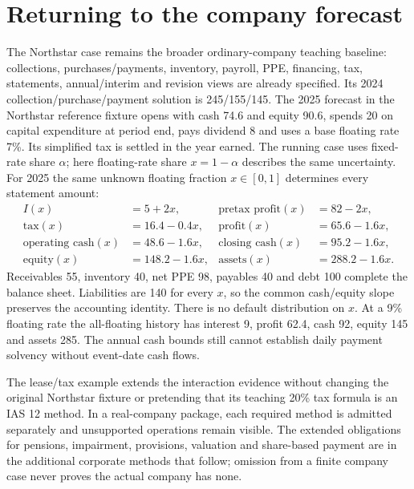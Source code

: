 

\hypertarget{returning-to-the-company-forecast}{%
\section{Returning to the company forecast}\label{method-corporate-methods-returning-to-the-company-forecast}}

The Northstar case remains the broader ordinary-company teaching baseline: collections, purchases/payments, inventory, payroll, PPE, financing, tax, statements, annual/interim and revision views are already specified. Its 2024 collection/purchase/payment solution is 245/155/145. The 2025 forecast in the Northstar reference fixture opens with cash 74.6 and equity 90.6, spends 20 on capital expenditure at period end, pays dividend 8 and uses a base floating rate 7\%. Its simplified tax is settled in the year earned. The running case uses fixed-rate share $\alpha$; here floating-rate share $x=1-\alpha$ describes the same uncertainty. For 2025 the same unknown floating fraction $x\in[0,1]$ determines every
statement amount:
\begin{align*}
 I(x)&=5+2x, & \text{pretax profit}(x)&=82-2x,\\
 \text{tax}(x)&=16.4-0.4x, & \text{profit}(x)&=65.6-1.6x,\\
 \text{operating cash}(x)&=48.6-1.6x, & \text{closing cash}(x)&=95.2-1.6x,\\
 \text{equity}(x)&=148.2-1.6x, & \text{assets}(x)&=288.2-1.6x.
\end{align*}
Receivables 55, inventory 40, net PPE 98, payables 40 and debt 100 complete the
balance sheet. Liabilities are 140 for every $x$, so the common cash/equity
slope preserves the accounting identity. There is no default distribution on
$x$. At a 9\% floating rate the all-floating history has interest 9, profit
62.4, cash 92, equity 145 and assets 285. The annual cash bounds still cannot
establish daily payment solvency without event-date cash flows.

The lease/tax example extends the interaction evidence without changing the original Northstar fixture or pretending that its teaching 20\% tax formula is an IAS 12 method. In a real-company package, each required method is admitted separately and unsupported operations remain visible. The extended obligations for pensions, impairment, provisions, valuation and share-based payment are in the additional corporate methods that follow; omission from a finite company case never proves the actual company has none.
